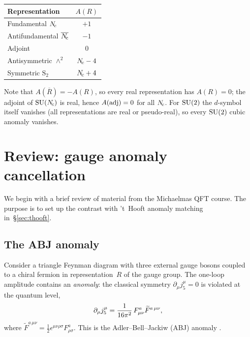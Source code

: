 \documentclass[11pt,a4paper]{article}
\begin{document}
\begin{center}
\renewcommand{\arraystretch}{1.3}
\begin{tabular}{@{}l c@{}}
\toprule
\textbf{Representation} & $A(R)$ \\
\midrule
Fundamental $N_{\!c}$ & $+1$ \\
Antifundamental $\overline{N_{\!c}}$ & $-1$ \\
Adjoint & $0$ \\
Antisymmetric $\wedge^2$ & $N_{\!c} - 4$ \\
Symmetric $\mathrm{S}_2$ & $N_{\!c} + 4$ \\
\bottomrule
\end{tabular}
\end{center}

\noindent Note that $A(\overline{R}) = -A(R)$, so every real
representation has $A(R) = 0$; the adjoint of $\mathrm{SU}(N_{\!c})$ is real, hence
$A(\mathrm{adj}) = 0$ for all $N_{\!c}$.  For $\mathrm{SU}(2)$ the $d$-symbol itself
vanishes (all representations are real or pseudo-real), so every
$\mathrm{SU}(2)$ cubic anomaly vanishes.


\section{Review: gauge anomaly cancellation}
\label{sec:gauge-anomaly}

We begin with a brief review of material from the Michaelmas QFT course.
The purpose is to set up the contrast with 't~Hooft anomaly matching
in~\S\ref{sec:thooft}.

\subsection{The ABJ anomaly}

Consider a triangle Feynman diagram with three external gauge bosons
coupled to a chiral fermion in representation~$R$ of the gauge group.
The one-loop amplitude contains an \emph{anomaly}: the classical symmetry
$\partial_\mu j^\mu_5 = 0$ is violated at the quantum level,
\begin{equation}
  \partial_\mu j^\mu_5 = \frac{1}{16\pi^2}\, F_{\mu\nu}^a \widetilde{F}^{a\,\mu\nu},
  \label{eq:abj}
\end{equation}
where $\widetilde{F}^{a\,\mu\nu} = \tfrac{1}{2}\epsilon^{\mu\nu\rho\sigma}
F^a_{\rho\sigma}$.  This is the Adler--Bell--Jackiw (ABJ) anomaly
\cite{Adler1969,BellJackiw1969}.
\end{document}
